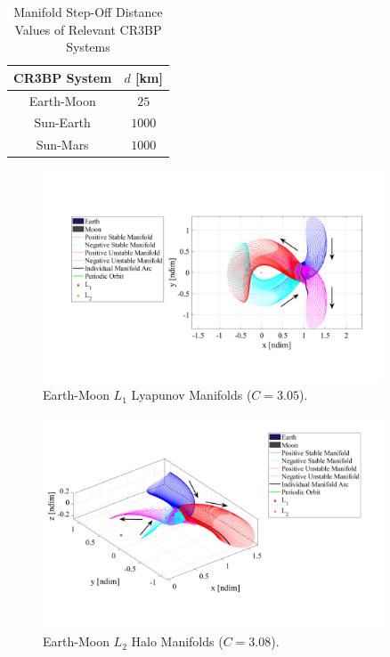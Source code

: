 \begin{table}[ht]
    \centering
    \caption{Manifold Step-Off Distance Values of Relevant CR3BP Systems}
    \begin{tabular}{|c|c|}
        \hline
        \textbf{CR3BP System}   &   \boldmath$d$ \textbf{[km]}  \\  \hline
        Earth-Moon              &   $25$                        \\  \hline
        Sun-Earth               &   $1000$                      \\  \hline
        Sun-Mars                &   $1000$                      \\  \hline
    \end{tabular}
    \label{tab:dValues}
\end{table}

\begin{figure}[ht]
    \centering
    \includegraphics[width=0.9\textwidth]{figures/LyapunovManifold.pdf}
    \caption{Earth-Moon $L_{1}$ Lyapunov Manifolds ($C=3.05$).}
    \label{fig:LyapunovManifold}
\end{figure}

\begin{figure}[ht]
    \centering
    \includegraphics[width=0.9\textwidth]{figures/HaloManifold.pdf}
    \caption{Earth-Moon $L_{2}$ Halo Manifolds ($C=3.08$).}
    \label{fig:haloManifold}
\end{figure}
